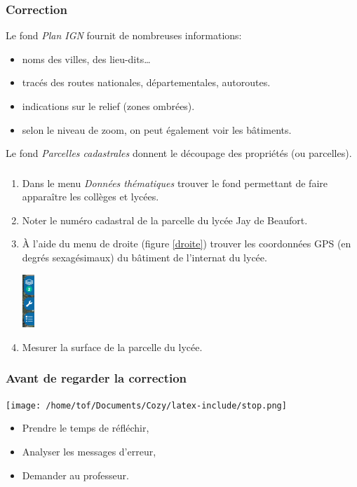\documentclass[svgnames,11pt]{beamer}
\begin{document}
\begin{frame}
    \frametitle{Correction}

    Le fond \emph{Plan IGN} fournit de nombreuses informations:
    \begin{itemize}
        \item noms des villes, des lieu-dits\dots
        \item tracés des routes nationales, départementales, autoroutes.
        \item indications sur le relief (zones ombrées).
        \item selon le niveau de zoom, on peut également voir les bâtiments.
    \end{itemize}
Le fond \emph{Parcelles cadastrales} donnent le découpage des propriétés (ou parcelles).

\end{frame}
\begin{frame}
    \frametitle{}

    \begin{activite}
        \begin{enumerate}
            \item Dans le menu \emph{Données thématiques} trouver le fond permettant de faire apparaître les collèges et lycées.
            \item Noter le numéro cadastral de la parcelle du lycée Jay de Beaufort.
            \item À l'aide du menu de droite (figure \ref{droite}) trouver les coordonnées GPS (en degrés sexagésimaux) du bâtiment de l'internat du lycée.
            \begin{center}
            \centering
            \includegraphics[height=2cm]{ressources/droite.png}
            \label{droite}
            \end{center}
            \item Mesurer la surface de la parcelle du lycée.
        \end{enumerate}
        \end{activite}

\end{frame}
\begin{frame}
    \frametitle{Avant de regarder la correction}
\begin{center}
    \centering
    \texttt{[image: /home/tof/Documents/Cozy/latex-include/stop.png]}
    \end{center}
{\Large
    \begin{itemize}
        \item Prendre le temps de réfléchir,
        \item Analyser les messages d'erreur,
        \item Demander au professeur.
    \end{itemize}
}
\end{frame}
\end{document}
